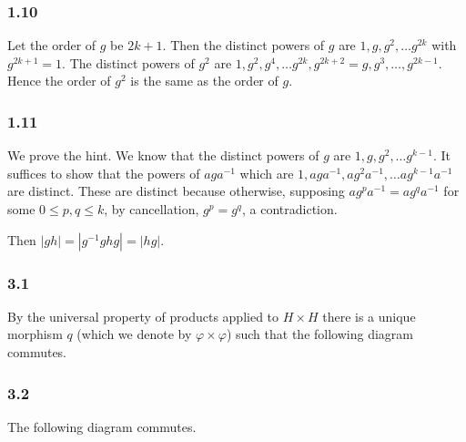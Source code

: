 \documentclass{article}
\begin{document}
\subsubsection*{1.10}

Let the order of $g$ be $2k + 1$. Then the distinct powers of $g$ are $1, g, g^2, \ldots g^{2k}$ with $g^{2k+1} = 1$. The distinct powers of $g^2$ are $1, g^2, g^4, \ldots g^{2k}, g^{2k+2} = g, g^3, \ldots, g^{2k-1}$. Hence the order of $g^2$ is the same as the order of $g$.

\subsubsection*{1.11}

We prove the hint. We know that the distinct powers of $g$ are $1, g, g^2, \ldots g^{k-1}$. It suffices to show that the powers of $aga^{-1}$ which are $1, aga^{-1}, ag^2a^{-1}, \ldots ag^{k-1}a^{-1}$ are distinct. These are distinct because otherwise, supposing $ag^{p}a^{-1} = ag^{q}a^{-1}$ for some $0 \le p, q \le k$, by cancellation, $g^p = g^q$, a contradiction.

Then $|gh| = |g^{-1}ghg| = |hg|$.

\subsubsection*{3.1}

By the universal property of products applied to $H \times H$ there is a unique morphism $q$ (which we denote by $\varphi \times \varphi$) such that the following diagram commutes.


\subsubsection*{3.2}

The following diagram commutes.

\end{document}
